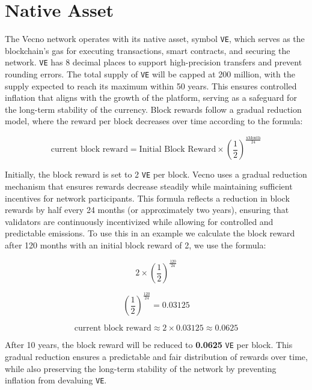 \documentclass[a4paper,onecolumn,superscriptaddress,10pt]{compositionalityarticle}
\begin{document}
\newpage

\section{Native Asset}

The Vecno network operates with its native asset, symbol \texttt{VE}, which serves as the blockchain's gas for executing transactions, smart contracts, and securing the network. \texttt{VE} has 8 decimal places to support high-precision transfers and prevent rounding errors. The total supply of \texttt{VE} will be capped at 200 million, with the supply expected to reach its maximum within 50 years. This ensures controlled inflation that aligns with the growth of the platform, serving as a safeguard for the long-term stability of the currency. Block rewards follow a gradual reduction model, where the reward per block decreases over time according to the formula:

\[
\text{current block reward} = \text{Initial Block Reward} \times {\left( \frac{1}{2} \right)}^{\frac{\text{xMonth}}{24}}
\]
\vspace{0.3cm}

Initially, the block reward is set to 2 \texttt{VE} per block. Vecno uses a gradual reduction mechanism that ensures rewards decrease steadily while maintaining sufficient incentives for network participants. This formula reflects a reduction in block rewards by half every 24 months (or approximately two years), ensuring that validators are continuously incentivized while allowing for controlled and predictable emissions. To use this in an example we calculate the block reward after 120 months with an initial block reward of 2, we use the formula:
\vspace{0.4cm}

\[
2 \times {\left( \frac{1}{2} \right)}^{\frac{120}{24}}
\]

\vspace{0.3cm}
\[
{\left( \frac{1}{2} \right)}^{\frac{120}{24}} = 0.03125
\]

\vspace{0.3cm}

\[
\text{current block reward} \approx 2 \times 0.03125 \approx 0.0625
\]


\vspace{0.3cm}

After 10 years, the block reward will be reduced to \textbf{0.0625} \texttt{VE} per block. This gradual reduction ensures a predictable and fair distribution of rewards over time, while also preserving the long-term stability of the network by preventing inflation from devaluing \texttt{VE}. 
\vspace{0.3cm}
\end{document}
